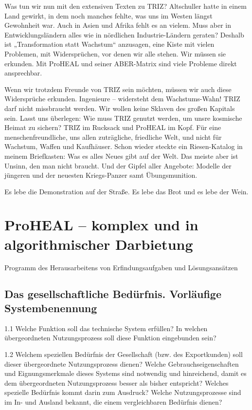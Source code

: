 \documentclass[12pt,a4paper]{article}
\begin{document}
Was tun wir nun mit den extensiven Texten zu TRIZ? Altschuller hatte in einem
Land gewirkt, in dem noch manches fehlte, was uns im Westen längst Gewohnheit
war.  Auch in Asien und Afrika fehlt es an vielem. Muss aber in
Entwicklungsländern alles wie in nördlichen Industrie-Ländern geraten? Deshalb
ist „Transformation statt Wachstum“ anzusagen, eine Kiste mit vielen Problemen,
mit Widersprüchen, vor denen wir alle stehen. Wir müssen sie erkunden. Mit
ProHEAL und seiner ABER-Matrix sind viele Probleme direkt ansprechbar.

Wenn wir trotzdem Freunde von TRIZ sein möchten, müssen wir auch diese
Widersprüche erkunden. Ingenieure – widersteht dem Wachstums-Wahn! TRIZ darf
nicht missbraucht werden. Wir wollen keine Sklaven des großen Kapitals sein.
Lasst uns überlegen: Wie muss TRIZ genutzt werden, um unsre kosmische Heimat zu
sichern? TRIZ im Rucksack und ProHEAL im Kopf. Für eine menschenfreundliche,
uns allen zuträgliche, friedliche Welt, und nicht für Wachstum, Waffen und
Kaufhäuser. Schon wieder steckte ein Riesen-Katalog in meinem Briefkasten: Was
es alles Neues gibt auf der Welt. Das meiste aber ist Unsinn, den man nicht
braucht. Und der Gipfel aller Angebote: Modelle der jüngeren und der neuesten
Kriegs-Panzer samt Übungsmunition.

Es lebe die Demonstration auf der Straße. Es lebe das Brot und es lebe der
Wein.

\section{ProHEAL – komplex und in algorithmischer Darbietung}

Programm des Herausarbeitens von Erfindungsaufgaben und Lösungsansätzen

\subsection{Das gesellschaftliche Bedürfnis. Vorläufige Systembenennung}

1.1 Welche Funktion soll das technische System erfüllen? In welchen
übergeordneten Nutzungsprozess soll diese Funktion eingebunden sein?

1.2 Welchem speziellen Bedürfnis der Gesellschaft (bzw. des Exportkunden) soll
dieser übergeordnete Nutzungsprozess dienen? Welche Gebrauchseigenschaften und
Eignungsmerkmale dieses Systems sind notwendig und hinreichend, damit es dem
übergeordneten Nutzungsprozess besser als bisher entspricht? Welches spezielle
Bedürfnis kommt darin zum Ausdruck? Welche Nutzungsprozesse sind im In- und
Ausland bekannt, die einem vergleichbaren Bedürfnis dienen?
\end{document}
